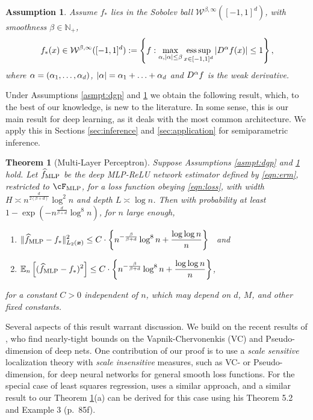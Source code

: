 \documentclass[11pt]{article}
\newtheorem{theorem}{Theorem}
\newtheorem{assumption}{Assumption}
\numberwithin{equation}{section}
\theoremstyle{definition}
\newcommand{\E}{\mathbb{E}}
\newcommand{\bx}{\bm{x}}
\DeclareMathOperator*{\supess}{ess\,sup}
\begin{document}
\begin{assumption}
	\label{asmpt:sobolev}
	Assume $f_*$ lies in the Sobolev ball $\mathcal{W}^{\beta, \infty}([-1, 1]^d)$, with smoothness $\beta \in \mathbb{N}_+$, 
	\begin{equation*}
		f_*(x) \in \mathcal{W}^{\beta, \infty}([-1, 1]^d) := \left\{ f:  \max_{{\bf\alpha}, |{\bf\alpha}| \leq \beta} \supess_{x \in [-1, 1]^d}  |D^{\alpha} f(x)| \leq 1  \right\},
	\end{equation*}
	where ${\bf\alpha} = (\alpha_1, \ldots, \alpha_d)$, $|{\bf\alpha}| = \alpha_1 + \ldots + \alpha_d$ and $D^{{\bf\alpha}} f$ is the weak derivative.
\end{assumption}


Under Assumptions \ref{asmpt:dgp} and \ref{asmpt:sobolev} we obtain the following result, which, to the best of our knowledge, is new to the literature. In some sense, this is our main result for deep learning, as it deals with the most common architecture. We apply this in Sections \ref{sec:inference} and \ref{sec:application} for semiparametric inference. 
\begin{theorem}[Multi-Layer Perceptron]
	\label{thm:mlp rate}
	Suppose Assumptions \ref{asmpt:dgp} and \ref{asmpt:sobolev} hold. Let $\widehat{f}_{\rm MLP}$ be the deep MLP-ReLU network estimator defined by \eqref{eqn:erm}, restricted to $\cF_{\rm MLP}$, for a loss function obeying \eqref{eqn:loss}, with width $H \asymp n^{\frac{d}{2(\beta + d)}} \log^2 n$ and depth $L \asymp \log n$. Then with probability at least $1 - \exp(-n^{\frac{d}{\beta+d}} \log^8 n)$, for $n$ large enough,
	\begin{enumerate}
		\item $\displaystyle \| \widehat{f}_{\rm MLP} - f_* \|_{L_2(\bx)}^2 \leq C \cdot \left\{ n^{-\frac{\beta}{\beta+d}} \log^8 n + \frac{\log \log n}{n} \right\}$ \ and 
		\item $\displaystyle \E_n \left[ (\widehat{f}_{\rm MLP} - f_* )^2 \right] \leq  C \cdot \left\{ n^{-\frac{\beta}{\beta+d}} \log^8 n + \frac{\log \log n}{n} \right\} $,
	\end{enumerate}
	for a constant $C>0$ independent of $n$, which may depend on $d$, $M$, and other fixed constants.
\end{theorem}



Several aspects of this result warrant discussion. We build on the recent results of \citet{Bartlett-etal2017_COLT}, who find nearly-tight bounds on the Vapnik-Chervonenkis (VC) and Pseudo-dimension of deep nets. One contribution of our proof is to use a \emph{scale sensitive} localization theory with \emph{scale insensitive} measures, such as VC- or Pseudo-dimension, for deep neural networks for general smooth loss functions. For the special case of least squares regression, \cite{Koltchinskii2011_book} uses a similar approach, and a similar result to our Theorem \ref{thm:mlp rate}(a) can be derived for this case using his Theorem 5.2 and Example 3 (p.\ 85f).
\end{document}
